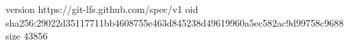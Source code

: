 version https://git-lfs.github.com/spec/v1
oid sha256:29022d35117711bb4608755e463d845238d49619960a5ec582ac9d99758c9688
size 43856

